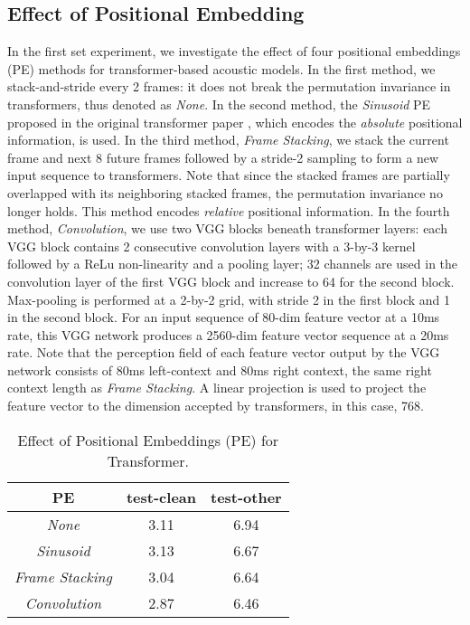 \documentclass{article}
\begin{document}
\subsection{Effect of Positional Embedding}
\label{ssec:positional_embedding}
In the first set experiment, we investigate the effect of four positional embeddings (PE) methods for transformer-based acoustic models. In the first method, we stack-and-stride every 2 frames: it does not break the permutation invariance in transformers, thus denoted as \emph{None}. In the second method, the \emph{Sinusoid} PE proposed in the original transformer paper \cite{vaswani2017attention}, which encodes the \emph{absolute} positional information, is used. In the third method, \emph{Frame Stacking}, we stack the current frame and next 8 future frames followed by a stride-2 sampling to form a new input sequence to transformers. Note that since the stacked frames are partially overlapped with its neighboring stacked frames, the permutation invariance no longer holds. This method encodes \emph{relative} positional information. In the fourth method, \emph{Convolution}, we use two VGG blocks \cite{simonyan2014very} beneath transformer layers: each VGG block contains 2 consecutive convolution layers with a 3-by-3 kernel followed by a ReLu non-linearity and a pooling layer; 32 channels are used in the convolution layer of the first VGG block and increase to 64 for the second block. Max-pooling is performed at a 2-by-2 grid, with stride 2 in the first block and 1 in the second block. For an input sequence of 80-dim feature vector at a 10ms rate, this VGG network produces a 2560-dim feature vector sequence at a 20ms rate. Note that the perception field of each feature vector output by the VGG network consists of 80ms left-context and 80ms right context, the same right context length as \emph{Frame Stacking}. A linear projection is used to project the feature vector to the dimension accepted by transformers, in this case, 768.  
\vspace{-1em}

\begin{table}[hhtb]
    \centering
    \caption{Effect of Positional Embeddings (PE) for Transformer.}
    \begin{tabular}{|c||cc|}
    \hline
    PE     &  \rm{test-clean} & \rm{test-other}\\
    \hline\hline
    \emph{None}   & 3.11  & 6.94 \\
    \emph{Sinusoid} & 3.13 & 6.67 \\
    \emph{Frame Stacking} & 3.04  & 6.64 \\
    \emph{Convolution} & 2.87 & 6.46 \\
    \hline
    \end{tabular}
    \label{tab:pe}
\end{table}
\vspace{-0.5em}
\end{document}
